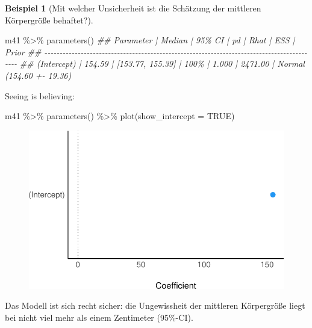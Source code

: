 \documentclass[
  a4paper,
  DIV=11]{scrreprt}
\newenvironment{Shaded}{\begin{snugshade}}{\end{snugshade}}
\newcommand{\AttributeTok}[1]{\textcolor[rgb]{0.40,0.45,0.13}{#1}}
\newcommand{\ConstantTok}[1]{\textcolor[rgb]{0.56,0.35,0.01}{#1}}
\newcommand{\DocumentationTok}[1]{\textcolor[rgb]{0.37,0.37,0.37}{\textit{#1}}}
\newcommand{\FunctionTok}[1]{\textcolor[rgb]{0.28,0.35,0.67}{#1}}
\newcommand{\NormalTok}[1]{\textcolor[rgb]{0.00,0.23,0.31}{#1}}
\newcommand{\SpecialCharTok}[1]{\textcolor[rgb]{0.37,0.37,0.37}{#1}}
\theoremstyle{definition}
\newtheorem{example}{Beispiel}[chapter]
\theoremstyle{remark}
\begin{document}
\leavevmode{}%
\begin{example}[Mit welcher Unsicherheit ist die Schätzung der mittleren
Körpergröße behaftet?]\label{exm-kung5}

\begin{Shaded}
\begin{Highlighting}[]
\NormalTok{m41 }\SpecialCharTok{\%\textgreater{}\%} 
  \FunctionTok{parameters}\NormalTok{()}
\DocumentationTok{\#\# Parameter   | Median |           95\% CI |   pd |  Rhat |     ESS |                    Prior}
\DocumentationTok{\#\# {-}{-}{-}{-}{-}{-}{-}{-}{-}{-}{-}{-}{-}{-}{-}{-}{-}{-}{-}{-}{-}{-}{-}{-}{-}{-}{-}{-}{-}{-}{-}{-}{-}{-}{-}{-}{-}{-}{-}{-}{-}{-}{-}{-}{-}{-}{-}{-}{-}{-}{-}{-}{-}{-}{-}{-}{-}{-}{-}{-}{-}{-}{-}{-}{-}{-}{-}{-}{-}{-}{-}{-}{-}{-}{-}{-}{-}{-}{-}{-}{-}{-}{-}{-}{-}{-}{-}{-}{-}{-}{-}}
\DocumentationTok{\#\# (Intercept) | 154.59 | [153.77, 155.39] | 100\% | 1.000 | 2471.00 | Normal (154.60 +{-} 19.36)}
\end{Highlighting}
\end{Shaded}

Seeing is believing:

\begin{Shaded}
\begin{Highlighting}[]
\NormalTok{m41 }\SpecialCharTok{\%\textgreater{}\%} 
  \FunctionTok{parameters}\NormalTok{() }\SpecialCharTok{\%\textgreater{}\%} 
  \FunctionTok{plot}\NormalTok{(}\AttributeTok{show\_intercept =} \ConstantTok{TRUE}\NormalTok{)}
\end{Highlighting}
\end{Shaded}

\begin{figure}[H]

{\centering \includegraphics{./gauss_files/figure-pdf/unnamed-chunk-6-1.pdf}

}

\end{figure}

Das Modell ist sich recht sicher: die Ungewissheit der mittleren
Körpergröße liegt bei nicht viel mehr als einem Zentimeter (95\%-CI).

\end{example}
\end{document}
